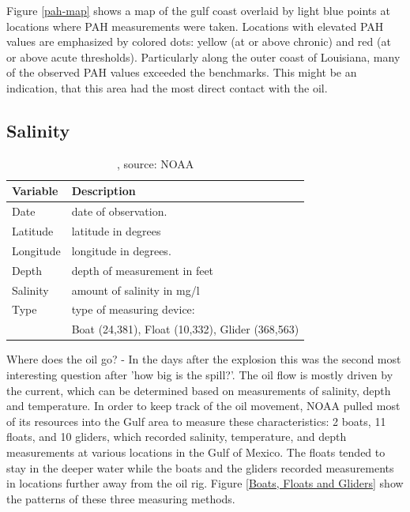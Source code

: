 \documentclass[authoryear,12pt]{elsarticle}
\begin{document}
Figure \ref{pah-map} shows a map of the gulf coast overlaid by light blue points at locations where PAH measurements were taken. Locations with elevated PAH values are emphasized by colored dots: yellow (at or above chronic) and red (at or above acute thresholds).  Particularly along the outer coast of Louisiana, many of the observed PAH values exceeded the benchmarks.  This might be an indication, that this area had the most direct contact with the oil.  

\subsection{Salinity}

\begin{table}
\begin{tabular}{lp{9.5cm}}\hline
\bf Variable & \bf Description \\\hline
Date & date of observation. \\
Latitude & latitude in degrees \\
Longitude & longitude in degrees. \\
Depth & depth of measurement in feet \\
Salinity &  amount of salinity in mg/l \\
Type &  type of measuring device: \\
& {\small Boat (24,381), Float (10,332), Glider (368,563)} \\\hline
\end{tabular}
\label{table.salinity}
\caption{, source: NOAA}
\end{table}

Where does the oil go? - In the days after the explosion this was the second most interesting question after 'how big is the spill?'.  The oil flow is mostly driven by the current, which can be determined based on measurements of salinity, depth and temperature. 
In order to keep track of the oil movement, NOAA pulled most of its resources into the Gulf area to measure these characteristics:  2 boats, 11 floats, and 10 gliders, which recorded salinity, temperature, and depth measurements at various locations in the Gulf of Mexico. 
The floats tended to stay in the deeper water while the boats and the gliders recorded measurements in locations further away from the oil rig.  Figure \ref {Boats, Floats and Gliders} show the patterns of these three measuring methods. 
\end{document}
